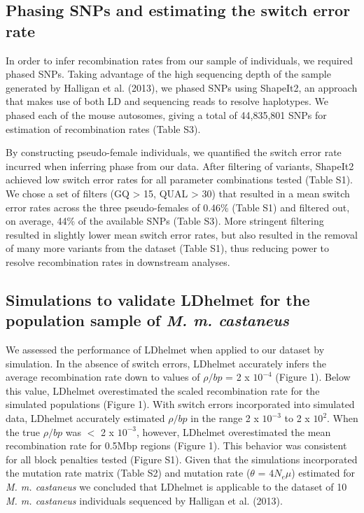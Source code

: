 \subsection{Phasing SNPs and estimating the switch error rate}
 
In order to infer recombination rates from our sample of individuals, we required phased SNPs. Taking advantage of the high sequencing depth of the sample generated by Halligan et al. (2013), we phased SNPs using ShapeIt2, an approach that makes use of both LD and sequencing reads to resolve haplotypes. We phased each of the mouse autosomes, giving a total of 44,835,801 SNPs for estimation of recombination rates (Table S3). 
 
By constructing pseudo-female individuals, we quantified the switch error rate incurred when inferring phase from our data. After filtering of variants, ShapeIt2 achieved low switch error rates for all parameter combinations tested (Table S1). We chose a set of filters (GQ > 15, QUAL > 30) that resulted in a mean switch error rates across the three pseudo-females of 0.46\% (Table S1) and filtered out, on average, 44\% of the available SNPs (Table S3). More stringent filtering resulted in slightly lower mean switch error rates, but also resulted in the removal of many more variants from the dataset (Table S1), thus reducing power to resolve recombination rates in downstream analyses.
 
\subsection{Simulations to validate LDhelmet for the population sample of \emph{M. m. castaneus}}
 
We assessed the performance of LDhelmet when applied to our dataset by simulation. In the absence of switch errors, LDhelmet accurately infers the average recombination rate down to values of $\rho/bp$ = 2 x $10^{-4}$ (Figure 1). Below this value, LDhelmet overestimated the scaled recombination rate for the simulated populations (Figure 1). With switch errors incorporated into simulated data, LDhelmet accurately estimated $\rho/bp$ in the range 2 x $10^{-3}$ to 2 x $10^{2}$. When the true $\rho/bp$ was $<$ 2 x $10^{-3}$, however, LDhelmet overestimated the mean recombination rate for 0.5Mbp regions (Figure 1). This behavior was consistent for all block penalties tested (Figure S1). Given that the simulations incorporated the mutation rate matrix (Table S2) and mutation rate ($\theta$ = $4N_{e}\mu$) estimated for \emph{M. m. castaneus} we concluded that LDhelmet is applicable to the dataset of 10 \emph{M. m. castaneus} individuals sequenced by Halligan et al. (2013).
 
